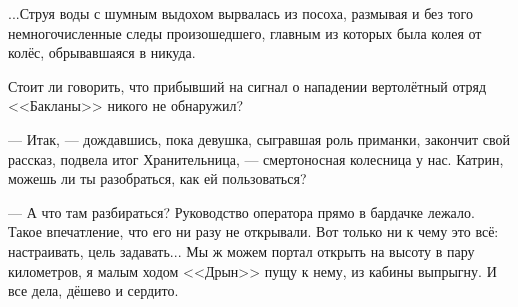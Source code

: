 ...Струя воды с шумным выдохом вырвалась из посоха, размывая и без того немногочисленные следы произошедшего,
главным из которых была колея от колёс, обрывавшаяся в никуда.

Стоит ли говорить, что прибывший на сигнал о нападении вертолётный отряд <<Бакланы>> никого не обнаружил?

\emptypar


--- Итак, --- дождавшись, пока девушка, сыгравшая роль приманки, закончит свой рассказ, подвела итог Хранительница,
--- смертоносная колесница у нас. Катрин, можешь ли ты разобраться, как ей пользоваться?

--- А что там разбираться? Руководство оператора прямо в бардачке лежало. Такое впечатление, что его ни разу не открывали.
Вот только ни к чему это всё: настраивать, цель задавать... Мы ж можем портал открыть на высоту в пару километров,
я малым ходом <<Дрын>> пущу к нему, из кабины выпрыгну. И все дела, дёшево и сердито.

\emptypar

\emptypar
